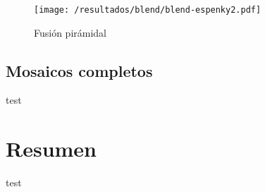 \begin{figure}[h]
	\centering
	\texttt{[image: /resultados/blend/blend-espenky2.pdf]}
	\caption[Fusión pirámidal]{Fusión pirámidal}
	\label{imagen:blend:espenky}
\end{figure}

\begin{figure}[H]
	\centering     %
	
	\caption[Fusión pirámidal]{}
	\label{imagen:blend:laplacian}
\end{figure}

\subsection*{Mosaicos completos}

test

\section{Resumen}
test
